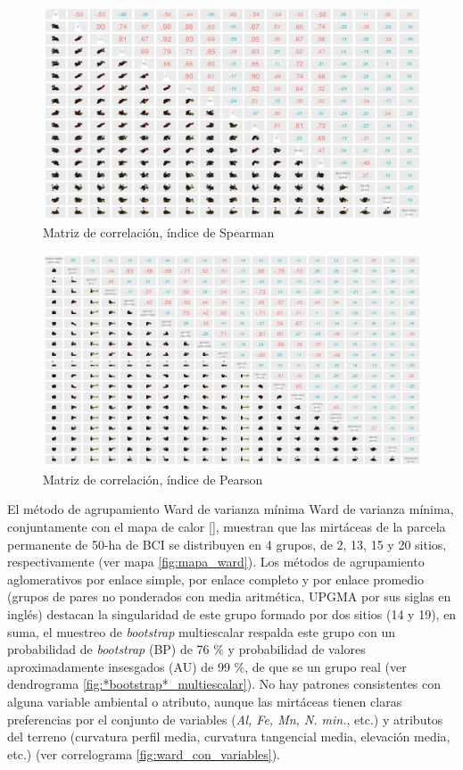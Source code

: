 \documentclass[11pt,]{article}
\begin{document}
\begin{figure}
\centering
\includegraphics{matriz_correlacion_suelo_abun_riq_spearman.png}
\caption{Matriz de correlación, índice de Spearman
\label{fig:matriz_spearman}}
\end{figure}

\begin{figure}
\centering
\includegraphics{matriz_correlacion_geomorf_abun_riq_spearman.png}
\caption{Matriz de correlación, índice de Pearson
\label{fig:matriz_pearson}}
\end{figure}

El método de agrupamiento Ward de varianza mínima Ward de varianza
mínima, conjuntamente con el mapa de calor {[}{]}, muestran que las
mirtáceas de la parcela permanente de 50-ha de BCI se distribuyen en 4
grupos, de 2, 13, 15 y 20 sitios, respectivamente (ver mapa
\ref{fig:mapa_ward}). Los métodos de agrupamiento aglomerativos por
enlace simple, por enlace completo y por enlace promedio (grupos de
pares no ponderados con media aritmética, UPGMA por sus siglas en
inglés) destacan la singularidad de este grupo formado por dos sitios
(14 y 19), en suma, el muestreo de \emph{bootstrap} multiescalar
respalda este grupo con un probabilidad de \emph{bootstrap} (BP) de 76
\% y probabilidad de valores aproximadamente insesgados (AU) de 99 \%,
de que se un grupo real (ver dendrograma
\ref {fig:*bootstrap*_multiescalar}). No hay patrones consistentes con
alguna variable ambiental o atributo, aunque las mirtáceas tienen claras
preferencias por el conjunto de variables (\emph{Al, Fe, Mn, N. min.},
etc.) y atributos del terreno (curvatura perfil media, curvatura
tangencial media, elevación media, etc.) (ver correlograma
\ref{fig:ward_con_variables}).
\end{document}
